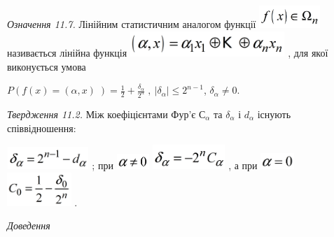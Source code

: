 \documentclass[a4paper]{article}
\newcounter{}
\begin{document}
\textit{Означення 11.7.}\textit{ } Лінійним статистичним аналогом функції 
\includegraphics[width=0.9098in,height=0.3354in]{crypt-img/crypt-img271.png} 
називається лінійна функція 
\includegraphics[width=2.2984in,height=0.3764in]{crypt-img/crypt-img272.png} ,
для якої виконується умова 

 ${P(f(x)=(\alpha ,x)\;)=\frac{1}{2}+\frac{\delta _{{\alpha
}}}{2^{{n}}}\;,\ |\delta _{{\alpha }}|\le 2^{{n-1}}}$,   ${\delta _{{\alpha
}}\neq 0\text{.}}$

\textit{Твердження 11.2.}\textit{ } Між коефіцієнтами  Фур’є  
${\text{С}_{{\alpha }}}$ та  ${\delta _{{\alpha }}}$  і   ${d_{{\alpha }}}$
існують співвідношення: 

 \includegraphics[width=1.2154in,height=0.3346in]{crypt-img/crypt-img273.png} ; 
при 
\includegraphics[width=0.4862in,height=0.2311in]{crypt-img/crypt-img274.png} 
\includegraphics[width=1.0791in,height=0.3646in]{crypt-img/crypt-img275.png} ,
а при 
\includegraphics[width=0.4965in,height=0.2409in]{crypt-img/crypt-img276.png}  
\includegraphics[width=0.9543in,height=0.5in]{crypt-img/crypt-img277.png} .

{\itshape
Доведення}
\end{document}
